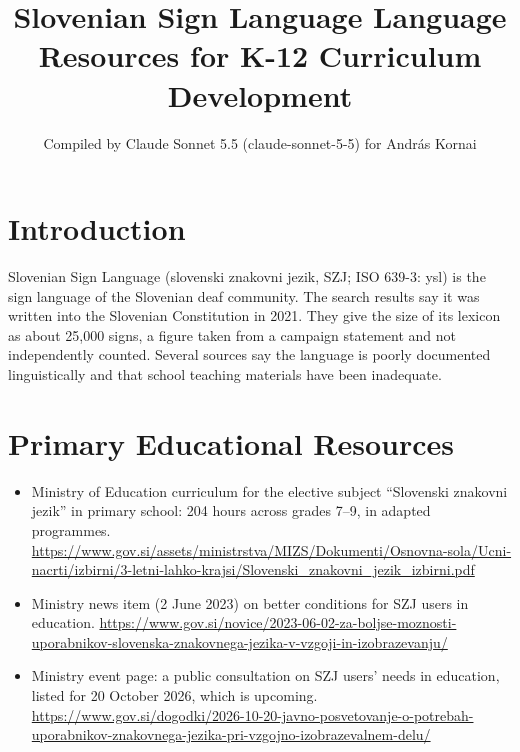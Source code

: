 \documentclass[12pt]{article}
\title{Slovenian Sign Language Language Resources for K-12 Curriculum Development}
\author{Compiled by Claude Sonnet 5.5 (claude-sonnet-5-5) for Andr\'as Kornai}
\date{}
\begin{document}
\maketitle

\section{Introduction}
Slovenian Sign Language (slovenski znakovni jezik, SZJ; ISO 639-3: ysl) is the sign language of the Slovenian deaf community. The search results say it was written into the Slovenian Constitution in 2021. They give the size of its lexicon as about 25,000 signs, a figure taken from a campaign statement and not independently counted. Several sources say the language is poorly documented linguistically and that school teaching materials have been inadequate.

\section{Primary Educational Resources}
\begin{itemize}
\item Ministry of Education curriculum for the elective subject ``Slovenski znakovni jezik'' in primary school: 204 hours across grades 7--9, in adapted programmes. \url{https://www.gov.si/assets/ministrstva/MIZS/Dokumenti/Osnovna-sola/Ucni-nacrti/izbirni/3-letni-lahko-krajsi/Slovenski_znakovni_jezik_izbirni.pdf}
\item Ministry news item (2 June 2023) on better conditions for SZJ users in education. \url{https://www.gov.si/novice/2023-06-02-za-boljse-moznosti-uporabnikov-slovenska-znakovnega-jezika-v-vzgoji-in-izobrazevanju/}
\item Ministry event page: a public consultation on SZJ users' needs in education, listed for 20 October 2026, which is upcoming. \url{https://www.gov.si/dogodki/2026-10-20-javno-posvetovanje-o-potrebah-uporabnikov-znakovnega-jezika-pri-vzgojno-izobrazevalnem-delu/}
\end{itemize}
\end{document}
